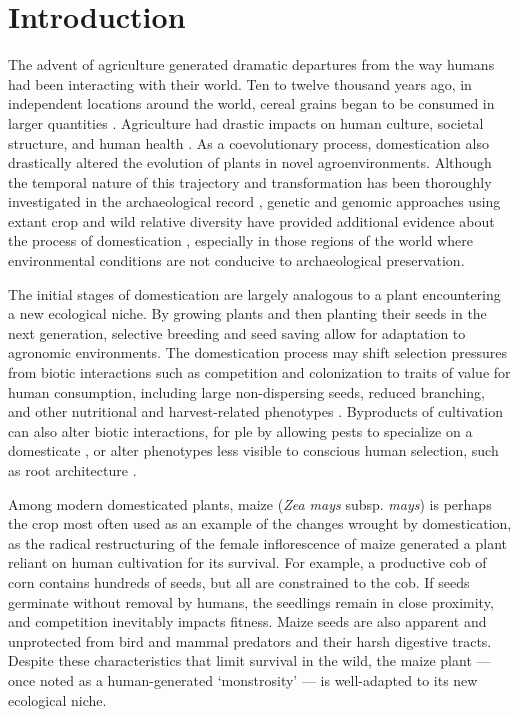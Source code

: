 \documentclass[9pt,twocolumn,twoside]{rilabRxiv}
\begin{document}
\section*{Introduction}

﻿The advent of agriculture generated dramatic departures from the way humans had been interacting with their world.
Ten to twelve thousand years ago, in independent locations around the world, cereal grains began to be consumed in larger quantities \citep{larson2014}.
Agriculture had drastic impacts on human culture, societal structure, and human health \citep{larsen2006}.
As a coevolutionary process, domestication also drastically altered the evolution of plants in novel agroenvironments.
Although the temporal nature of this trajectory and transformation has been thoroughly investigated in the archaeological record \citep{smith2001}, genetic and genomic approaches using extant crop and wild relative diversity have provided additional evidence about the process of domestication \citep{zeder2006}, especially in those regions of the world where environmental conditions are not conducive to archaeological preservation.

﻿The initial stages of domestication are largely analogous to a plant encountering a new ecological niche.
﻿By growing plants and then planting their seeds in the next generation, selective breeding and seed saving allow for adaptation to agronomic environments.
﻿The domestication process may shift selection pressures from biotic interactions such as competition and colonization to traits of value for human consumption, including large non-dispersing seeds, reduced branching, and other nutritional and harvest-related phenotypes \citep{doebley2006}.
Byproducts of cultivation can also alter biotic interactions, for ple by allowing pests to specialize on a domesticate \citep{bernal2018, gaillard2018}, or alter phenotypes less visible to conscious human selection, such as root architecture \citep{burton2013}.

﻿Among modern domesticated plants, maize (\textit{Zea mays} subsp. \textit{mays}) is perhaps the crop most often used as an example of the changes wrought by domestication, as the radical restructuring of the female inflorescence of maize generated a plant reliant on human cultivation for its survival.
﻿For example, a productive cob of corn contains hundreds of seeds, but all are constrained to the cob.
If seeds germinate without removal by humans, the seedlings remain in close proximity, and competition inevitably impacts fitness.
﻿Maize seeds are also apparent and unprotected from bird and mammal predators and their harsh digestive tracts.
Despite these characteristics that limit survival in the wild, the maize plant --- once noted as a human-generated `monstrosity' \citep{beadle1972} --- is well-adapted to its new ecological niche.
\end{document}
